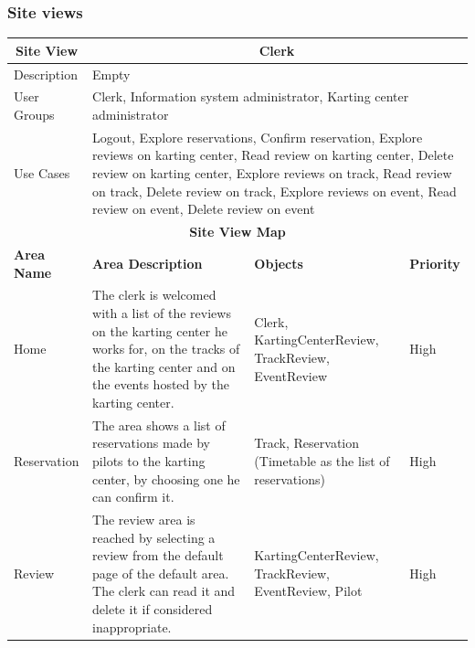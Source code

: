 \documentclass{beamer}
\begin{document}
\begin{frame}
    \frametitle{Site views}
    \begin{table}
        \centering
        \tiny
        \setlength{\tabcolsep}{1pt}
        \begin{tabular}{|m{2cm}|m{4cm}|m{3cm}|m{1cm}|}
        \hline
        \multicolumn{1}{|c|}{\textbf{Site View}} & \multicolumn{3}{c|}{\textbf{Clerk}} \\
        \hline
        Description & \multicolumn{3}{m{8cm}|}{Empty} \\
        \hline
        User Groups & \multicolumn{3}{m{8cm}|}{Clerk, 
        Information system administrator, Karting center administrator} \\
        \hline
        Use Cases & \multicolumn{3}{m{8cm}|}{Logout, Explore reservations, Confirm reservation,
        Explore reviews on karting center, Read review on karting center, Delete review on karting center,
        Explore reviews on track, Read review on track, Delete review on track, Explore reviews on event,
        Read review on event, Delete review on event} \\
        \hline
        \multicolumn{4}{|c|}{\textbf{Site View Map}} \\
        \hline
        \textbf{Area Name} & \textbf{Area Description} & \textbf{Objects} & \textbf{Priority} \\
        \hline
        Home & The clerk is welcomed with a list of the reviews on the karting center he works for,
        on the tracks of the karting center and on the events hosted by the karting center.
         & Clerk, KartingCenterReview, TrackReview, EventReview & High \\
        \hline
        Reservation & The area shows a list of reservations made by pilots to the karting center,
        by choosing one he can confirm it.
         & Track, Reservation (Timetable as the list of reservations) & High \\
        \hline
        Review & The review area is reached by selecting a review from the default page of the default area. 
        The clerk can read it and delete it
        if considered inappropriate.
         & KartingCenterReview, TrackReview, EventReview, Pilot & High \\
        \hline
        \end{tabular}
    \end{table}
\end{frame}
\end{document}
